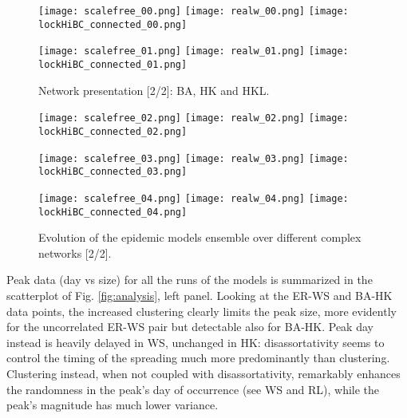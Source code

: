 \documentclass[DIV=12, BCOR=0pt]{scrartcl}  %
\begin{document}
  
  \clearpage
  
  \begin{figure}[h!]
  	\centering
  	\texttt{[image: scalefree\_00.png]}
  	\texttt{[image: realw\_00.png]}
  	\texttt{[image: lockHiBC\_connected\_00.png]}
  	
  	\texttt{[image: scalefree\_01.png]}
  	\texttt{[image: realw\_01.png]}
  	\texttt{[image: lockHiBC\_connected\_01.png]}
  	\caption{Network presentation [2/2]: BA, HK and HKL.}
  	\label{fig:networks1}
  \end{figure}  	
  
  \begin{figure}[h!]
  	\centering 
  	
  	\texttt{[image: scalefree\_02.png]}
  	\texttt{[image: realw\_02.png]}
  	\texttt{[image: lockHiBC\_connected\_02.png]}
  	
  	\texttt{[image: scalefree\_03.png]}
  	\texttt{[image: realw\_03.png]}
  	\texttt{[image: lockHiBC\_connected\_03.png]}
  	
  	\texttt{[image: scalefree\_04.png]}
  	\texttt{[image: realw\_04.png]}
  	\texttt{[image: lockHiBC\_connected\_04.png]}
  	
  	\caption{Evolution of the epidemic models ensemble over different complex networks [2/2].}
  	\label{fig:outcomes1}
  \end{figure}
  \clearpage
 
  
  Peak data (day vs size) for all the runs of the models is summarized in the scatterplot of Fig. \ref{fig:analysis}, left panel. Looking at the ER-WS and BA-HK data points, the increased clustering clearly limits the peak size, more evidently for the uncorrelated ER-WS pair but detectable also for BA-HK. Peak day instead is heavily delayed in WS, unchanged in HK: disassortativity seems to control the timing of the spreading much more predominantly than clustering. Clustering instead, when not coupled with disassortativity, remarkably enhances the randomness in the peak's day of occurrence (see WS and RL), while the peak's magnitude has much lower variance.
  
\end{document}
